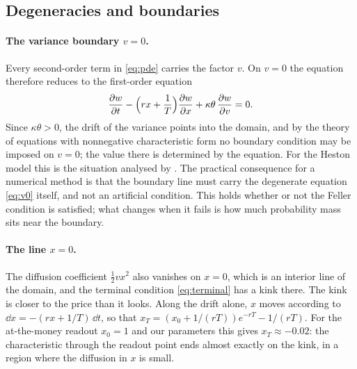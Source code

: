 \subsection{Degeneracies and boundaries}\label{sec:boundaries}

\paragraph{The variance boundary $v=0$.} Every second-order term in \eqref{eq:pde} carries the factor $v$.
On $v=0$ the equation therefore reduces to the first-order equation
\begin{equation}\label{eq:v0}
\frac{\partial w}{\partial t} - \Bigl(rx+\frac1T\Bigr)\frac{\partial w}{\partial x} + \kappa\theta\,\frac{\partial w}{\partial v} = 0 .
\end{equation}
Since $\kappa\theta>0$, the drift of the variance points into the domain, and by the theory of equations
with nonnegative characteristic form \citep{OleinikRadkevich1973} no boundary condition may be imposed
on $v=0$; the value there is determined by the equation. For the Heston model this is the situation
analysed by \citet{EkstromTysk2010}. The practical consequence for a numerical method is that the
boundary line must carry the degenerate equation \eqref{eq:v0} itself, and not an artificial condition.
This holds whether or not the Feller condition is satisfied; what changes when it fails is how much
probability mass sits near the boundary.

\paragraph{The line $x=0$.} The diffusion coefficient $\tfrac12vx^2$ also vanishes on $x=0$, which is an
interior line of the domain, and the terminal condition \eqref{eq:terminal} has a kink there. The kink is
closer to the price than it looks. Along the drift alone, $x$ moves according to
$\dd x = -(rx+1/T)\,\dd t$, so that $x_T = (x_0 + 1/(rT))e^{-rT} - 1/(rT)$. For the at-the-money readout
$x_0=1$ and our parameters this gives $x_T\approx-0.02$: the characteristic through the readout point ends
almost exactly on the kink, in a region where the diffusion in $x$ is small.

